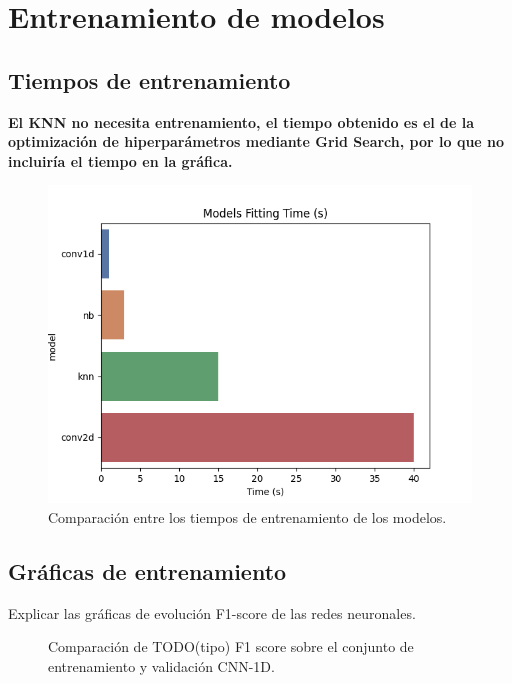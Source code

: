 \section{Entrenamiento de modelos}

  \subsection{Tiempos de entrenamiento}

    \textbf{El KNN no necesita entrenamiento, el tiempo obtenido es el de la optimización de hiperparámetros mediante Grid Search, por lo que no incluiría el tiempo en la gráfica.}

    \begin{figure}[h]
      \centering
      \includegraphics[width=16cm]{archivos/5.Resultados/TiemposEntrenamiento}
      \caption{Comparación entre los tiempos de entrenamiento de los modelos.}
      \label{TiemposEntrenamientoImage}
    \end{figure}

  
  \subsection{Gráficas de entrenamiento}

    Explicar las gráficas de evolución F1-score de las redes neuronales.


    \begin{figure}[h]
        \centering
        
        \caption{Comparación de TODO(tipo) F1 score sobre el conjunto de entrenamiento y validación CNN-1D.}
        \label{F1Score1DImage}
     \end{figure}


